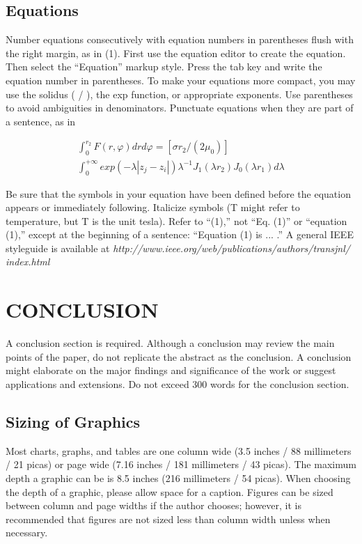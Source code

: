 \documentclass[journal]{IEEEtran}
\begin{document}
\subsection{Equations}
Number equations consecutively with equation numbers in parentheses flush with the right margin, as in (1). First use the equation editor to create the equation. Then select the “Equation” markup style. Press the tab key and write the equation number in parentheses. To make your equations more compact, you may use the solidus ( / ), the exp function, or appropriate exponents. Use parentheses to avoid ambiguities in denominators. Punctuate equations when they are part of a sentence, as in

\begin{equation}
\begin{multlined}
\int_{0}^{r_{2}} F(r,\varphi)dr d\varphi=[\sigma r_{2}/(2\mu_{0})]\\
\int_{0}^{+\infty}exp(-\lambda |z_{j}-z_{i} |)\lambda^{-1} J_{1}(\lambda r_{2}) J_{0}(\lambda r_{1})d\lambda 
\label{Eq:Example}
\end{multlined}
\end{equation}

Be sure that the symbols in your equation have been defined before the equation appears or immediately following. Italicize symbols (T might refer to temperature, but T is the unit tesla). Refer to “(1),” not “Eq. (1)” or “equation (1),” except at the beginning of a sentence: “Equation (1) is ... .”
A general IEEE styleguide is available at \textit{http://www.ieee.org/web/publications/authors/transjnl/ \\index.html}

\section{CONCLUSION}
A conclusion section is required. Although a conclusion may review the main points of the paper, do not replicate the abstract as the conclusion. A conclusion might elaborate on the major findings and significance of the work or suggest applications and extensions. Do not exceed 300 words for the conclusion section.

\subsection{Sizing of Graphics}
Most charts, graphs, and tables are one column wide (3.5 inches / 88 millimeters / 21 picas) or page wide (7.16 inches / 181 millimeters / 43 picas). The maximum depth a graphic can be is 8.5 inches (216 millimeters / 54 picas). When choosing the depth of a graphic, please allow space for a caption. Figures can be sized between column and page widths if the author chooses; however, it is recommended that figures are not sized less than column width unless when necessary. 
\end{document}
